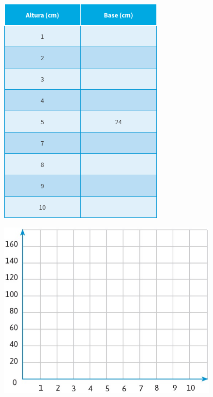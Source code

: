 \documentclass[11pt]{book}
\begin{document}
\begin{enumerate}
        \begin{minipage}[t]{0.35\linewidth}
          \begin{figure}[H]
            \centering
            \includegraphics[width=\linewidth]{paralelogramo.png}
            \label{tab:paralelogramo_table}
          \end{figure}%
          \begin{figure}[H]
            \centering
            \includegraphics[width=\linewidth]{cartesian_blank}

\end{figure}
\end{minipage}
\end{enumerate}
\end{document}
